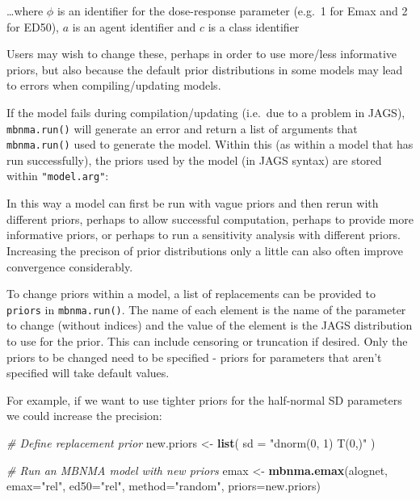 \documentclass[]{article}
\newenvironment{Shaded}{\begin{snugshade}}{\end{snugshade}}
\newcommand{\CommentTok}[1]{\textcolor[rgb]{0.56,0.35,0.01}{\textit{#1}}}
\newcommand{\DataTypeTok}[1]{\textcolor[rgb]{0.13,0.29,0.53}{#1}}
\newcommand{\KeywordTok}[1]{\textcolor[rgb]{0.13,0.29,0.53}{\textbf{#1}}}
\newcommand{\NormalTok}[1]{#1}
\newcommand{\OperatorTok}[1]{\textcolor[rgb]{0.81,0.36,0.00}{\textbf{#1}}}
\newcommand{\StringTok}[1]{\textcolor[rgb]{0.31,0.60,0.02}{#1}}
\begin{document}
\ldots{}where \(\phi\) is an identifier for the dose-response parameter
(e.g.~1 for Emax and 2 for ED50), \(a\) is an agent identifier and \(c\)
is a class identifier

Users may wish to change these, perhaps in order to use more/less
informative priors, but also because the default prior distributions in
some models may lead to errors when compiling/updating models.

If the model fails during compilation/updating (i.e.~due to a problem in
JAGS), \texttt{mbnma.run()} will generate an error and return a list of
arguments that \texttt{mbnma.run()} used to generate the model. Within
this (as within a model that has run successfully), the priors used by
the model (in JAGS syntax) are stored within \texttt{"model.arg"}:

\begin{Shaded}
\end{Shaded}

In this way a model can first be run with vague priors and then rerun
with different priors, perhaps to allow successful computation, perhaps
to provide more informative priors, or perhaps to run a sensitivity
analysis with different priors. Increasing the precison of prior
distributions only a little can also often improve convergence
considerably.

To change priors within a model, a list of replacements can be provided
to \texttt{priors} in \texttt{mbnma.run()}. The name of each element is
the name of the parameter to change (without indices) and the value of
the element is the JAGS distribution to use for the prior. This can
include censoring or truncation if desired. Only the priors to be
changed need to be specified - priors for parameters that aren't
specified will take default values.

For example, if we want to use tighter priors for the half-normal SD
parameters we could increase the precision:

\begin{Shaded}
\begin{Highlighting}[]
\CommentTok{# Define replacement prior}
\NormalTok{new.priors <-}\StringTok{ }\KeywordTok{list}\NormalTok{(}
  \DataTypeTok{sd =} \StringTok{"dnorm(0, 1) T(0,)"}
\NormalTok{  )}

\CommentTok{# Run an MBNMA model with new priors}
\NormalTok{emax <-}\StringTok{ }\KeywordTok{mbnma.emax}\NormalTok{(alognet, }\DataTypeTok{emax=}\StringTok{"rel"}\NormalTok{, }\DataTypeTok{ed50=}\StringTok{"rel"}\NormalTok{, }\DataTypeTok{method=}\StringTok{"random"}\NormalTok{,}
                   \DataTypeTok{priors=}\NormalTok{new.priors)}
\end{Highlighting}
\end{Shaded}
\end{document}
